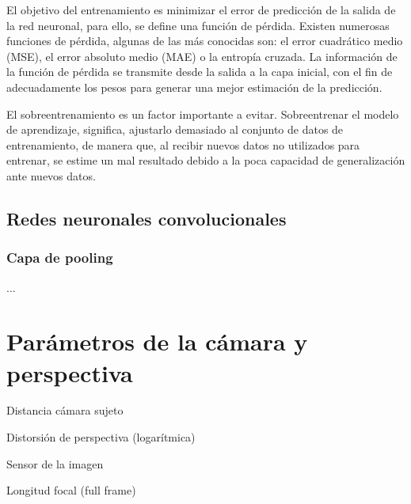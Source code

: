 El objetivo del entrenamiento es minimizar el error de predicción de la salida de la red neuronal, para ello, se define una función de pérdida. Existen numerosas funciones de pérdida, algunas de las más conocidas son: el error cuadrático medio (MSE), el error absoluto medio (MAE) o la entropía cruzada. La información de la función de pérdida se transmite desde la salida a la capa inicial, con el fin de adecuadamente los pesos para generar una mejor estimación de la predicción.

El sobreentrenamiento es un factor importante a evitar. Sobreentrenar el modelo de aprendizaje, significa, ajustarlo demasiado al conjunto de datos de entrenamiento, de manera que, al recibir nuevos datos no utilizados para entrenar, se estime un mal resultado debido a la poca capacidad de generalización ante nuevos datos.



\subsection{Redes neuronales convolucionales}


\subsubsection*{Capa de pooling}

...

\section{Parámetros de la cámara y perspectiva}

Distancia cámara sujeto

Distorsión de perspectiva (logarítmica)

Sensor de la imagen

Longitud focal (full frame)